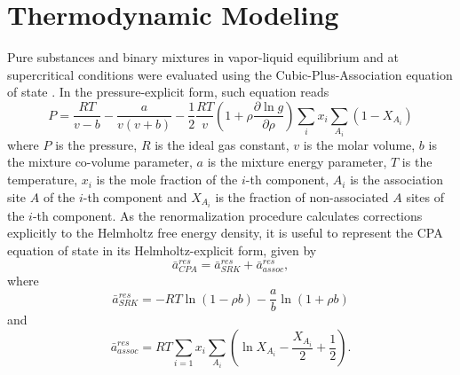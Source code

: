 \documentclass[preprint,12pt,3p]{elsarticle}
\begin{document}
\section{Thermodynamic Modeling}
Pure substances and binary mixtures in vapor-liquid equilibrium and at supercritical conditions were evaluated using the Cubic-Plus-Association equation of state  \citep{kontogeorgis1996equation}.
In the pressure-explicit form, such equation reads
\begin{equation} \label{eq:pressure_cpa}
P = \frac{RT}{v-b}-\frac{a}{v(v+b)}-\frac{1}{2}\frac{RT}{v} \left(1+\rho\frac{\partial \ln g}{\partial \rho}\right)\sum_{i} x_{i} \sum_{A_{i}}(1-X_{A_{i}})
\end{equation}
where $P$ is the pressure, $R$ is the ideal gas constant, $v$ is the molar volume, $b$ is the mixture co-volume parameter, $a$ is the mixture energy parameter, $T$ is the temperature, $x_{i}$ is the mole fraction of the $i$-th component, $A_{i}$ is the association site $A$ of the $i$-th component and $X_{A_{i}}$ is the fraction of non-associated $A$ sites of the $i$-th component.
As the renormalization procedure calculates corrections explicitly to the Helmholtz free energy density, it is useful to represent the CPA equation of state in its Helmholtz-explicit form, given by
\begin{equation} \label{eq:helm_res_cpa}
\bar{a}_{CPA}^{res} =\bar{a}_{SRK}^{res} + \bar{a}_{assoc}^{res},
\end{equation}
where
\begin{equation} \label{eq:helm_res_srk}
\bar{a}_{SRK}^{res} = -RT\ln(1-\rho b)-\frac{a}{b}\ln(1+\rho b)   
\end{equation}
and
\begin{equation} \label{eq:helm_res_assoc}
\bar{a}_{assoc}^{res} = RT\sum_{i=1} x_{i} \sum_{A_{i}}\left(\ln X_{A_{i}} - \frac{X_{A_{i}}}{2} + \frac{1}{2}\right).
\end{equation}
\end{document}
